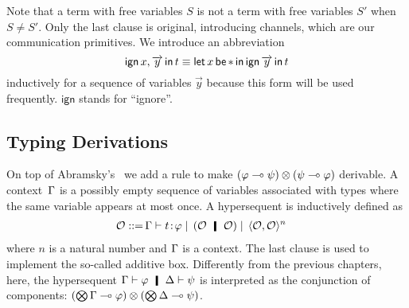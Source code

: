 Note that a term with free variables $S$ is not a term with free
variables $S'$ when $S\neq S'$.  Only the last clause is original,
introducing channels, which are our communication primitives.
We introduce an abbreviation
\[
 \mathsf{ign }\,{x,\overrightarrow y}\,\mathsf{ in }\,{t} \equiv \mathsf{let }\,{x}\,\mathsf{ be }\,{\ast}\,\mathsf{ in }\,{\mathsf{ign }\,{\overrightarrow y}\,\mathsf{ in }\,{t}}
\]
inductively for a sequence of variables $\vec y$
because this form will be used frequently.
$\mathsf{ign}$ stands for ``ignore''.

\subsection{Typing Derivations}

On top of Abramsky's~\citep{abramsky1993computational} we add a rule to
make $(\varphi\multimap\psi)\otimes(\psi\multimap\varphi)$ derivable.
A context~$\Gamma$ is a possibly empty sequence of variables associated with
types where the same variable appears at most once.
A hypersequent is inductively defined as
\begin{align*}
 \hypert ::=\, &\G\tr\tj{t}{\phi}
 \mid\, (\hypert\hmid \hypert)
 \mid\, \lpair{\hypert,\hypert}^n
\end{align*}
where $n$ is a natural number and $\Gamma$ is a context. 
The last clause is used to implement the so-called additive box.
Differently from the previous chapters,
here, the hypersequent $\G\tr\phi\hmid \D\tr\psi$ is interpreted as the
conjunction of components:
$(\bigotimes\Gamma\multimap\varphi)\otimes (\bigotimes\Delta\multimap\psi)$.

